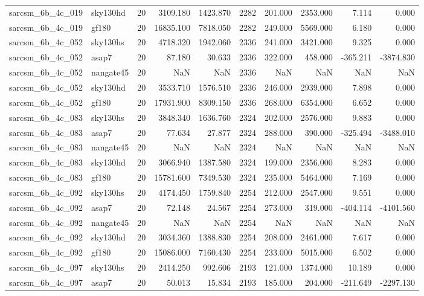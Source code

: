 \documentclass{article}
\begin{document}
\begin{longtable}{llrrrrrrrr}
sarcsm\_6b\_4c\_019 & sky130hd & 20 & 3109.180 & 1423.870 & 2282 & 201.000 & 2353.000 & 7.114 & 0.000 \\
sarcsm\_6b\_4c\_019 & gf180 & 20 & 16835.100 & 7818.050 & 2282 & 249.000 & 5569.000 & 6.180 & 0.000 \\
sarcsm\_6b\_4c\_052 & sky130hs & 20 & 4718.320 & 1942.060 & 2336 & 241.000 & 3421.000 & 9.325 & 0.000 \\
sarcsm\_6b\_4c\_052 & asap7 & 20 & 87.180 & 30.633 & 2336 & 322.000 & 458.000 & -365.211 & -3874.830 \\
sarcsm\_6b\_4c\_052 & nangate45 & 20 & NaN & NaN & 2336 & NaN & NaN & NaN & NaN \\
sarcsm\_6b\_4c\_052 & sky130hd & 20 & 3533.710 & 1576.510 & 2336 & 246.000 & 2939.000 & 7.898 & 0.000 \\
sarcsm\_6b\_4c\_052 & gf180 & 20 & 17931.900 & 8309.150 & 2336 & 268.000 & 6354.000 & 6.652 & 0.000 \\
sarcsm\_6b\_4c\_083 & sky130hs & 20 & 3848.340 & 1636.760 & 2324 & 202.000 & 2576.000 & 9.883 & 0.000 \\
sarcsm\_6b\_4c\_083 & asap7 & 20 & 77.634 & 27.877 & 2324 & 288.000 & 390.000 & -325.494 & -3488.010 \\
sarcsm\_6b\_4c\_083 & nangate45 & 20 & NaN & NaN & 2324 & NaN & NaN & NaN & NaN \\
sarcsm\_6b\_4c\_083 & sky130hd & 20 & 3066.940 & 1387.580 & 2324 & 199.000 & 2356.000 & 8.283 & 0.000 \\
sarcsm\_6b\_4c\_083 & gf180 & 20 & 15781.600 & 7349.530 & 2324 & 235.000 & 5464.000 & 7.169 & 0.000 \\
sarcsm\_6b\_4c\_092 & sky130hs & 20 & 4174.450 & 1759.840 & 2254 & 212.000 & 2547.000 & 9.551 & 0.000 \\
sarcsm\_6b\_4c\_092 & asap7 & 20 & 72.148 & 24.567 & 2254 & 273.000 & 319.000 & -404.114 & -4101.560 \\
sarcsm\_6b\_4c\_092 & nangate45 & 20 & NaN & NaN & 2254 & NaN & NaN & NaN & NaN \\
sarcsm\_6b\_4c\_092 & sky130hd & 20 & 3034.360 & 1388.830 & 2254 & 208.000 & 2461.000 & 7.617 & 0.000 \\
sarcsm\_6b\_4c\_092 & gf180 & 20 & 15086.000 & 7160.430 & 2254 & 233.000 & 5015.000 & 6.502 & 0.000 \\
sarcsm\_6b\_4c\_097 & sky130hs & 20 & 2414.250 & 992.606 & 2193 & 121.000 & 1374.000 & 10.189 & 0.000 \\
sarcsm\_6b\_4c\_097 & asap7 & 20 & 50.013 & 15.834 & 2193 & 185.000 & 204.000 & -211.649 & -2297.130 \\

\end{longtable}
\end{document}
